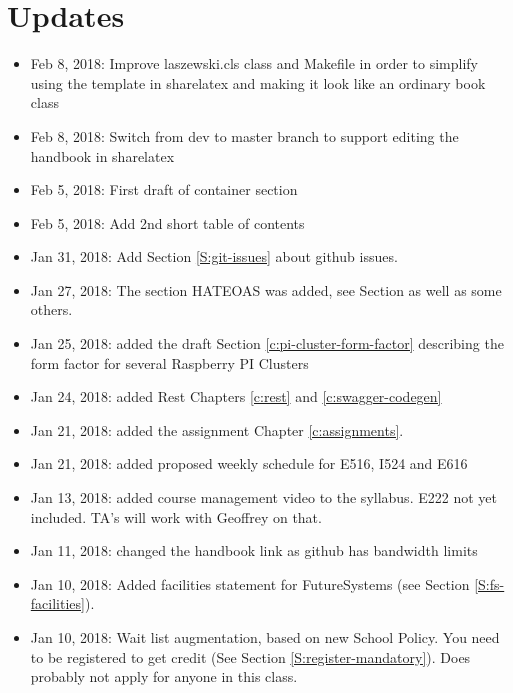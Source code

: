 
\chapter{Updates}

\begin{itemize}

\item Feb 8, 2018: Improve laszewski.cls class and Makefile in order
  to simplify using the template in sharelatex and making it look like
  an ordinary book class
\item Feb 8, 2018: Switch from dev to master branch to support editing
  the handbook in sharelatex
\item Feb 5, 2018: First draft of container section
\item Feb 5, 2018: Add 2nd short table of contents
\item Jan 31, 2018: Add Section \ref{S:git-issues} about github issues.
\item Jan 27, 2018: The section HATEOAS was added, see
  Section \label{s:hateoas} as well as some others.
\item Jan 25, 2018: added the draft Section
  \ref{c:pi-cluster-form-factor} describing the form factor for
  several Raspberry PI Clusters

\item Jan 24, 2018: added Rest Chapters \ref{c:rest} and
  \ref{c:swagger-codegen}
 
\item Jan 21, 2018: added the assignment Chapter \ref{c:assignments}.

\item Jan 21, 2018: added proposed weekly schedule for E516, I524 and
  E616

\item Jan 13, 2018: added course management video to the
  syllabus. E222 not yet included. TA's will work with Geoffrey on
  that.

\item Jan 11, 2018: changed the handbook link as github has bandwidth
  limits

\item Jan 10, 2018: Added facilities statement for FutureSystems (see
  Section \ref{S:fs-facilities}).

\item Jan 10, 2018: Wait list augmentation, based on new School
  Policy. You need to be registered to get credit (See Section
  \ref{S:register-mandatory}). Does probably not apply for anyone in
  this class.

\end{itemize}
